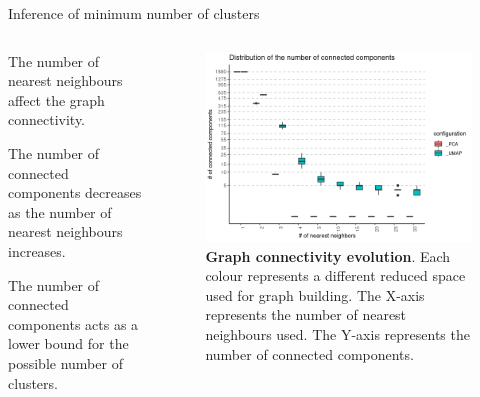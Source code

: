 \begin{frame}{Inference of minimum number of clusters}
    \begin{columns}
        \begin{column}{0.45\textwidth}
            \justifying

            The number of nearest neighbours affect the graph connectivity.
            \bigskip


            The number of connected components decreases as the number of nearest neighbours increases.
            \bigskip

            The number of connected components acts as a lower bound for the possible number of clusters.


        \end{column}

        \begin{column}{0.5\textwidth}
            \begin{figure}
                \centering
                \includegraphics[width=\textwidth]{images/ch3/3_conn_comp.png}
                \caption{\justifying \textbf{Graph connectivity evolution}. Each colour represents a different reduced space used for graph building. The X-axis represents the number of nearest neighbours used. The Y-axis represents the number of connected components. }
            \end{figure}
        \end{column}
    \end{columns}
\end{frame}


